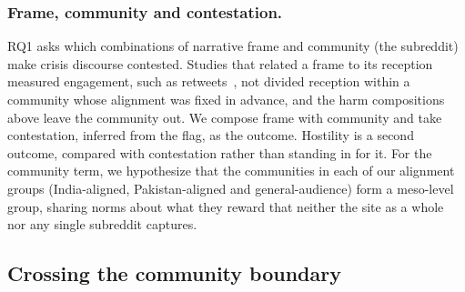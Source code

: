\subsubsection{Frame, community and contestation.} RQ1 asks which combinations of narrative frame and community (the subreddit) make crisis discourse contested.
Studies that related a frame to its reception measured engagement, such as retweets~\cite{mendelsohn2021framing,mejova2025narratives}, not divided reception within a community whose alignment was fixed in advance, and the harm compositions above leave the community out. We compose frame with community and take contestation, inferred from the flag, as the outcome. Hostility is a second outcome, compared with contestation rather than standing in for it. For the community term, we hypothesize that the communities in each of our alignment groups (India-aligned, Pakistan-aligned and general-audience) form a meso-level group, sharing norms about what they reward that neither the site as a whole nor any single subreddit captures.


\subsection{Crossing the community boundary}
\label{sec:rw-crossing}


